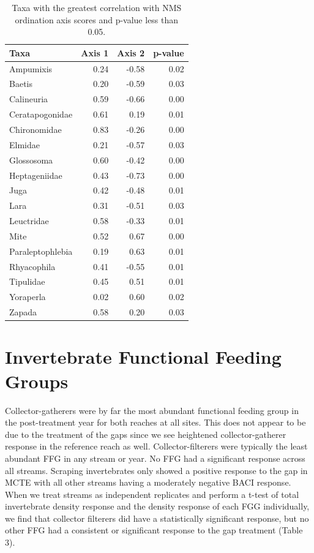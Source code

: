 \documentclass[double,12pt]{beavtex}
\begin{document}
  \begin{table}[t]
  
  \caption{\label{tab:nmstable}Taxa with the greatest correlation with NMS ordination axis scores and p-value less than 0.05.}
  \centering
  \begin{tabular}{lrrr}
  \toprule
  Taxa & Axis 1 & Axis 2 & p-value\\
  \midrule
  Ampumixis & 0.24 & -0.58 & 0.02\\
  Baetis & 0.20 & -0.59 & 0.03\\
  Calineuria & 0.59 & -0.66 & 0.00\\
  Ceratapogonidae & 0.61 & 0.19 & 0.01\\
  Chironomidae & 0.83 & -0.26 & 0.00\\
  \addlinespace
  Elmidae & 0.21 & -0.57 & 0.03\\
  Glossosoma & 0.60 & -0.42 & 0.00\\
  Heptageniidae & 0.43 & -0.73 & 0.00\\
  Juga & 0.42 & -0.48 & 0.01\\
  Lara & 0.31 & -0.51 & 0.03\\
  \addlinespace
  Leuctridae & 0.58 & -0.33 & 0.01\\
  Mite & 0.52 & 0.67 & 0.00\\
  Paraleptophlebia & 0.19 & 0.63 & 0.01\\
  Rhyacophila & 0.41 & -0.55 & 0.01\\
  Tipulidae & 0.45 & 0.51 & 0.01\\
  \addlinespace
  Yoraperla & 0.02 & 0.60 & 0.02\\
  Zapada & 0.58 & 0.20 & 0.03\\
  \bottomrule
  \end{tabular}
  \end{table}
  
  \section*{Invertebrate Functional Feeding
  Groups}\label{invertebrate-functional-feeding-groups}
  
  Collector-gatherers were by far the most abundant functional feeding
  group in the post-treatment year for both reaches at all sites. This
  does not appear to be due to the treatment of the gaps since we see
  heightened collector-gatherer response in the reference reach as well.
  Collector-filterers were typically the least abundant FFG in any stream
  or year. No FFG had a significant response across all streams. Scraping
  invertebrates only showed a positive response to the gap in MCTE with
  all other streams having a moderately negative BACI response. When we
  treat streams as independent replicates and perform a t-test of total
  invertebrate density response and the density response of each FGG
  individually, we find that collector filterers did have a statistically
  significant response, but no other FFG had a consistent or significant
  response to the gap treatment (Table 3).
  
\end{document}
